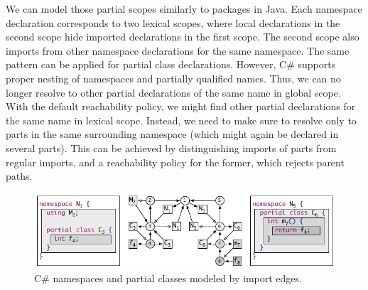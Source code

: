 We can model those partial scopes similarly to packages in Java.
Each namespace declaration corresponds to two lexical scopes,
  where local declarations in the second scope hide imported declarations in the first scope.
The second scope also imports from other namespace declarations for the same namespace.
The same pattern can be applied for partial class declarations.
However, C\# supports proper nesting of namespaces and partially qualified names.
Thus, we can no longer resolve to other partial declarations of the same name in global scope.
With the default reachability policy,
  we might find other partial declarations for the same name in lexical scope.
Instead, we need to make sure to resolve only to parts in the same surrounding namespace 
  (which might again be declared in several parts).
This can be achieved by distinguishing imports of parts from regular imports,
  and a reachability policy for the former, which rejects parent paths. 

\begin{figure}[t]
\begin{boxedminipage}{\hsize}
\centering\includegraphics{figures/scope-graphs/csharp/partial.pdf}
\end{boxedminipage}
\caption{C\# namespaces and partial classes modeled by import edges.}
\end{figure}

\endinput
\begin{figure}[h]
\begin{minipage}{3cm}
\begin{lstlisting}[language=Java]
val x = 1;
{ 
  import p.x;
  x // ambiguous reference
}
\end{lstlisting}
\end{minipage}
  \caption{Java package and type declarations in different compilation units.}
  \label{figureLabel}
\end{figure}





	  
